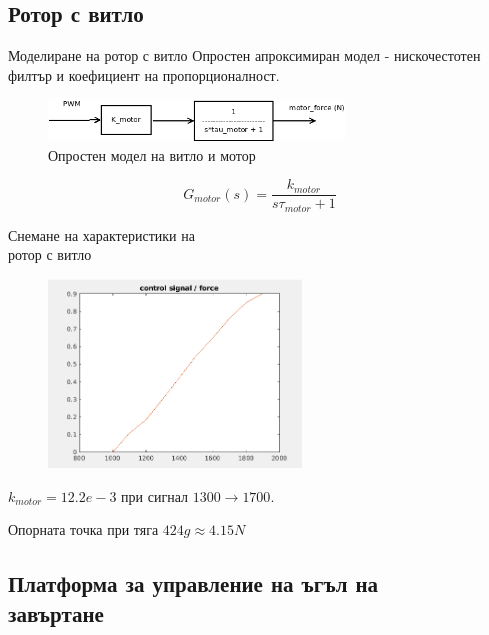 \documentclass{beamer}
\begin{document}
\subsection{Ротор с витло}

\begin{frame}{Моделиране на ротор с витло}
	\pause
	Опростен апроксимиран модел - нискочестотен филтър и коефициент на пропорционалност.
	\pause
	\begin{figure}[htpb!]
		\centering
		\includegraphics[width=0.7\textwidth]{Images/motor_model.png}
		\caption{Опростен модел на витло и мотор}
		\label{fig:motor_model}
	\end{figure}
	\pause
	\begin{equation*}
		G_{motor}(s) = \frac{k_{motor}}{s \tau_{motor} + 1}
		\label{eqn:motor_model}
	\end{equation*}

\end{frame}

\begin{frame}{Снемане на характеристики на \\ротор с витло}
	\pause
\begin{figure}[htpb!]
    \centering
    \includegraphics[width=0.6\textwidth]{Images/control_force.png}
\end{figure}

\pause
\(k_{motor} = 12.2e-3\) при сигнал \(1300\to1700\).
\pause

Опорната точка при тяга \(424g \approx 4.15N\)

\end{frame}

\subsection{Платформа за управление на ъгъл на\\ завъртане}
\end{document}
